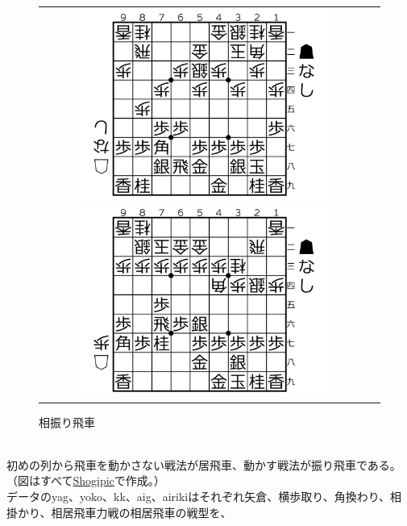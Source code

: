 \documentclass[11pt,a4paper,dvipdfmx]{jsarticle}
\begin{document}
\begin{figure}[h]
    \begin{tabular}{cc}
        \begin{minipage}[t]{0.47\hsize}
            \centering
            \includegraphics[width=0.8\textwidth]{graph/taikou.png}
            \caption{対抗系}
        \end{minipage}
        \begin{minipage}[t]{0.47\hsize}
            \centering
            \includegraphics[width=0.8\textwidth]{graph/aifuri.png}
            \caption{相振り飛車}
        \end{minipage}
    \end{tabular}
\end{figure}
\\
初めの列から飛車を動かさない戦法が居飛車、動かす戦法が振り飛車である。（図はすべて\href{https://shogipic.jp/}{Shogipic}で作成。）
\\
データのyag、yoko、kk、aig、airikiはそれぞれ矢倉、横歩取り、角換わり、相掛かり、相居飛車力戦の相居飛車の戦型を、
\end{document}
